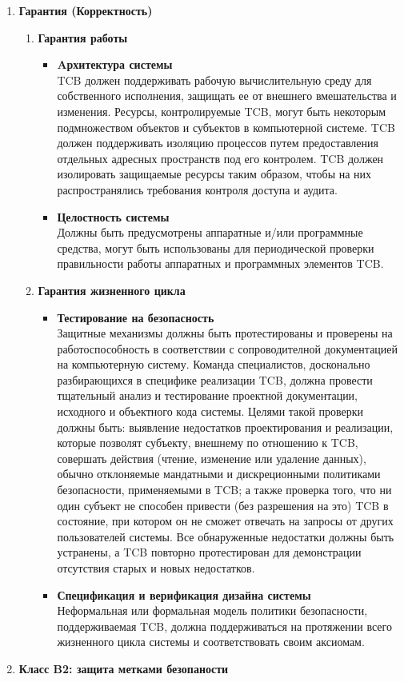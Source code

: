 \begin{enumerate}
\begin{enumerate}
\begin{enumerate}
		\end{enumerate}
		\item{\textbf{Гарантия (Корректность)}}
		\begin{enumerate}
			\item{\textbf{Гарантия работы}}
			\begin{itemize}
				\item{\textbf{Aрхитектура системы}}\\
				TCB должен поддерживать рабочую вычислительную среду для собственного исполнения, защищать ее от внешнего вмешательства и изменения. Ресурсы, контролируемые TCB, могут быть
				некоторым подмножеством объектов и субъектов в компьютерной системе. TCB должен поддерживать изоляцию процессов путем предоставления отдельных адресных пространств под его контролем.
				TCB должен изолировать защищаемые ресурсы таким образом, чтобы на них распространялись требования контроля доступа и аудита.
				\item{\textbf{Целостность системы}}\\
				Должны быть предусмотрены аппаратные и/или программные средства, могут быть использованы для периодической проверки правильности работы аппаратных и программных элементов TCB.
			\end{itemize}
			\item{\textbf{Гарантия жизненного цикла}}
			\begin{itemize}
				\item{\textbf{Тестирование на безопасность}}\\
				Защитные механизмы должны быть протестированы и проверены на работоспособность в соответствии с сопроводителной документацией на компьютерную систему.  Команда специалистов,
				досконально разбирающихся в специфике реализации TCB, должна провести тщательный анализ и тестирование проектной документации, исходного и объектного кода системы. Целями такой
				проверки должны быть: выявление недостатков проектирования и реализации, которые позволят субъекту, внешнему по отношению к TCB, совершать действия (чтение, изменение или удаление данных),
				обычно отклоняемые мандатными и дискреционными политиками безопасности, применяемыми в TCB; а также проверка того, что ни один субъект не способен привести (без разрешения на это)
				TCB в состояние, при котором он не сможет отвечать на запросы от других пользователей системы. Все обнаруженные недостатки должны быть устранены, а TCB повторно протестирован для 
				демонстрации отсутствия старых и новых недостатков. 
				\item{\textbf{Спецификация и верификация дизайна системы}}\\
				Неформальная или формальная модель политики безопасности, поддерживаемая TCB, должна поддерживаться на протяжении всего жизненного цикла системы и соответствовать своим аксиомам.
			\end{itemize}
		\end{enumerate}
		\item{\textbf{Класс B2: защита метками безопаности}}\\
	\end{enumerate}
\end{enumerate}


